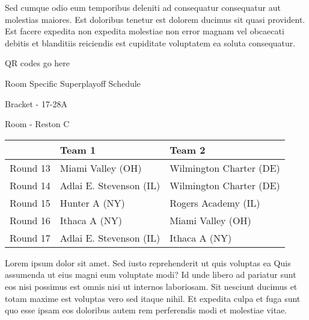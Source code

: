 \documentclass{article}%
\begin{document}
\newline%
Sed cumque odio eum temporibus deleniti ad consequatur consequatur aut molestias maiores. Est doloribus tenetur est dolorem ducimus sit quasi provident. Est facere expedita non expedita molestiae non error magnam vel obcaecati debitis et blanditiis reiciendis est cupiditate voluptatem ea soluta consequatur.%
\vspace*{140pt}%
\begin{center}%
\begin{Huge}%
QR codes go here%
\end{Huge}%
\end{center}%
\newpage%
\begin{center}%
\begin{Huge}%
Room Specific Superplayoff Schedule%
\end{Huge}%
\vspace*{8pt}%
\linebreak%
\begin{Large}%
Bracket {-} 17{-}28A%
\end{Large}%
\vspace*{8pt}%
\linebreak%
\vspace*{8pt}%
\begin{Large}%
Room {-} Reston C%
\end{Large}%
\end{center}%
%
\begin{tabularx}{\textwidth}{|c|Y|Y|}%
\hline%
&Team 1&Team 2\\%
\hline%
Round 13&Miami Valley (OH)&Wilmington Charter (DE)\\%
Round 14&Adlai E. Stevenson (IL)&Wilmington Charter (DE)\\%
Round 15&Hunter A (NY)&Rogers Academy (IL)\\%
Round 16&Ithaca A (NY)&Miami Valley (OH)\\%
Round 17&Adlai E. Stevenson (IL)&Ithaca A (NY)\\%
\hline%
\end{tabularx}%
\vspace*{8pt}%
\newline%
Lorem ipsum dolor sit amet. Sed iusto reprehenderit ut quis voluptas ea Quis assumenda ut eius magni eum voluptate modi? Id unde libero ad pariatur sunt eos nisi possimus est omnis nisi ut internos laboriosam. Sit nesciunt ducimus et totam maxime est voluptas vero sed itaque nihil. Et expedita culpa et fuga sunt quo esse ipsam eos doloribus autem rem perferendis modi et molestiae vitae.\newline%
\end{document}
